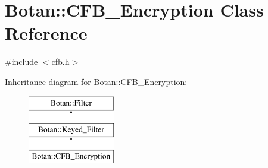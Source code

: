 \hypertarget{classBotan_1_1CFB__Encryption}{\section{Botan\-:\-:C\-F\-B\-\_\-\-Encryption Class Reference}
\label{classBotan_1_1CFB__Encryption}
}


{\ttfamily \#include $<$cfb.\-h$>$}

Inheritance diagram for Botan\-:\-:C\-F\-B\-\_\-\-Encryption\-:\begin{figure}[H]
\begin{center}
\leavevmode
\includegraphics[height=3.000000cm]{classBotan_1_1CFB__Encryption}
\end{center}
\end{figure}
